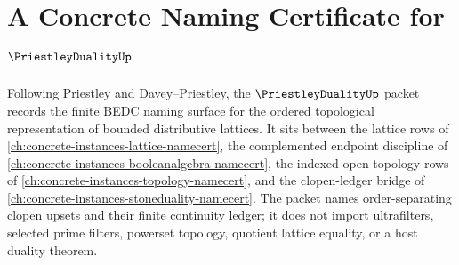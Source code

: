 \chapter{A Concrete Naming Certificate for $\PriestleyDualityUp$}
\label{ch:concrete-instances-priestley-duality-namecert}

Following Priestley and Davey--Priestley, the $\PriestleyDualityUp$ packet records the finite BEDC naming surface for the ordered topological representation of bounded distributive lattices. It sits between the lattice rows of \autoref{ch:concrete-instances-lattice-namecert}, the complemented endpoint discipline of \autoref{ch:concrete-instances-booleanalgebra-namecert}, the indexed-open topology rows of \autoref{ch:concrete-instances-topology-namecert}, and the clopen-ledger bridge of \autoref{ch:concrete-instances-stoneduality-namecert}. The packet names order-separating clopen upsets and their finite continuity ledger; it does not import ultrafilters, selected prime filters, powerset topology, quotient lattice equality, or a host duality theorem.

